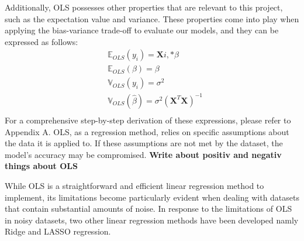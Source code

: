 \noindent Additionally, OLS possesses other properties that are relevant to this project,
such as the expectation value and variance. These properties come into play 
when applying the bias-variance trade-off to evaluate our models, and they can 
be expressed as follows:
\begin{align}
&\mathbb{E}_{OLS}(y_i) = \textbf{X}{i,*} \beta\\
&\mathbb{E}_{OLS}(\beta) = \beta\\
&\mathbb{V}_{OLS}(y_i) = \sigma^2\\
&\mathbb{V}_{OLS}(\hat{\beta}) = \sigma^2 (\textbf{X}^T \textbf{X})^{-1} \\
\end{align}
\noindent For a comprehensive step-by-step derivation of these expressions, please refer
to Appendix A. OLS, as a regression method, relies on specific assumptions 
about the data it is applied to. If these assumptions are not met by the 
dataset, the model's accuracy may be compromised. 
\newline \newline
\textbf{Write about positiv and negativ things about OLS}
\newline \newline

\noindent While OLS is a straightforward and efficient linear regression method 
to implement, its limitations become particularly evident when dealing 
with datasets that contain substantial amounts of noise. In response to the 
limitations of OLS in noisy datasets, two other linear regression methods have been
developed namly Ridge and LASSO regression. 


